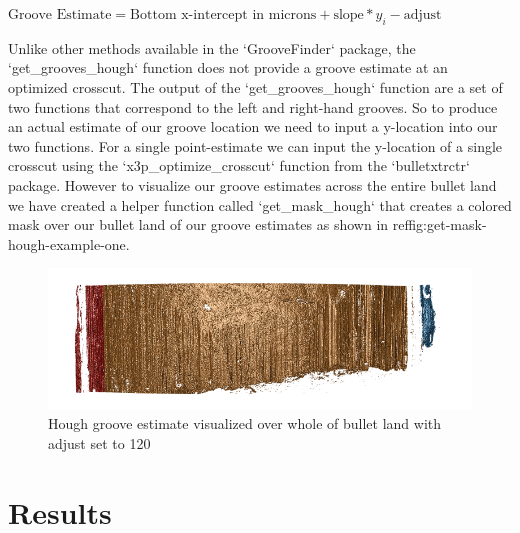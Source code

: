 \documentclass[12pt]{article}\usepackage[]{graphicx}\usepackage[]{color}
\makeatletter
\def\maxwidth{ %
  \ifdim\Gin@nat@width>\linewidth
    \linewidth
  \else
    \Gin@nat@width
  \fi
}
\newenvironment{knitrout}{}{} %
\theoremstyle{nonumberplain}
\makeatother
\begin{document}
\begin{center}
  $\text{Groove Estimate} = \text{Bottom x-intercept in microns} + \text{slope}*y_{i} - \text{adjust}$
\end{center}

 Unlike other methods available in the `GrooveFinder` package, the `get\_grooves\_hough` function does not provide a groove estimate at an optimized crosscut. The output of the  `get\_grooves\_hough` function are a set of two functions that correspond to the left and right-hand grooves. So to produce an actual estimate of our groove location we need to input a y-location into our two functions. For a single point-estimate we can input the y-location of a single crosscut using the `x3p\_optimize\_crosscut` function from the `bulletxtrctr` package. However to visualize our groove estimates across the entire bullet land we have created a helper function called `get\_mask\_hough` that creates a colored mask over our bullet land of our groove estimates as shown in ref{fig:get-mask-hough-example-one}. 
 


\begin{knitrout}
\color{fgcolor}\begin{figure}

{\centering \includegraphics[width=\maxwidth]{../images/mask-example} 

}

\caption[Hough groove estimate visualized over whole of bullet land with adjust set to 120]{Hough groove estimate visualized over whole of bullet land with adjust set to 120}\label{fig:get-mask-hough-example}
\end{figure}


\end{knitrout}
 


\section{Results}
\end{document}
